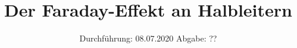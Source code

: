 

\subject{Nr. 46}
\title{Der Faraday-Effekt an Halbleitern}
\date{%
  Durchführung: 08.07.2020
  \hspace{3em}
  Abgabe: ??
}



\maketitle
\thispagestyle{empty}
\tableofcontents
\newpage






\printbibliography{}



